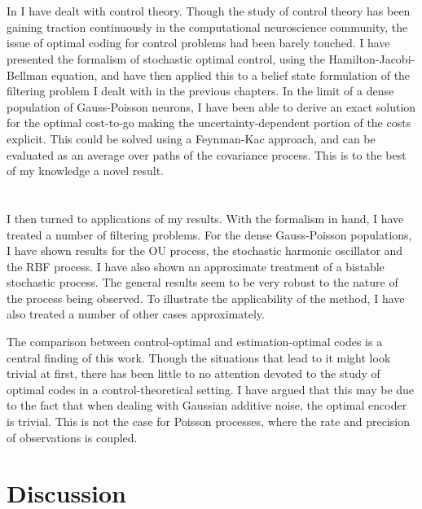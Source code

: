\section*{}

In  I have dealt with control theory. Though the study of control theory has been gaining traction continuously in the computational neuroscience 
community, the issue of optimal coding for control problems had been barely touched. I have presented the formalism of stochastic optimal control, using the Hamilton-Jacobi-Bellman 
equation, and have then applied this to a belief state formulation of the filtering problem I dealt with in the previous chapters. In the limit of a dense population of Gauss-Poisson
neurons, I have been able to derive an exact solution for the optimal cost-to-go making the uncertainty-dependent portion of the costs explicit. This could be solved using
a Feynman-Kac approach, and can be evaluated as an average over paths of the covariance process. This is to the best of my knowledge a novel result.

\section*{}

I then turned to applications of my results. With the formalism in hand, I have treated a number of filtering problems. For the dense Gauss-Poisson populations, I have shown results
for the OU process, the stochastic harmonic oscillator and the RBF process. I have also shown an approximate treatment of a bistable stochastic process. The general results seem
to be very robust to the nature of the process being observed. To illustrate the applicability of the method, I have also treated a number of other cases approximately.\par

The comparison between control-optimal and estimation-optimal codes is a central finding of this work. Though the situations that lead to it might look trivial at first, there has been little
to no attention devoted to the study of optimal codes in a control-theoretical setting. I have argued that this may be due to the fact that when dealing with Gaussian additive noise, the
optimal encoder is trivial. This is not the case for Poisson processes, where the rate and precision of observations is coupled.

\section*{Discussion}

